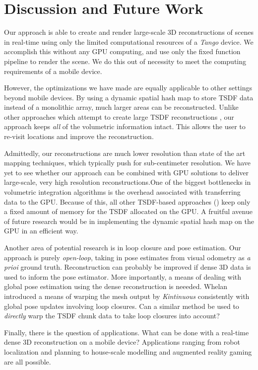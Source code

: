 \documentclass[10pt,twocolumn,letterpaper]{article}
\begin{document}
\section{Discussion and Future Work}
Our approach is able to create and render large-scale 3D reconstructions of
scenes in real-time using only the limited computational resources of a
\textit{Tango} device. We accomplish this without any GPU computing, and use
only the fixed function pipeline to render the scene. We do this out of
necessity to meet the computing requirements of a mobile device.

However, the optimizations we have made are equally applicable to other
settings beyond mobile devices. By using a dynamic spatial hash map to store
TSDF data instead of a monolithic array, much larger areas can be
reconstructed. Unlike other approaches which attempt to create large TSDF
reconstructions \cite{Whelan2013}, our approach keeps \textit{all} of the
volumetric information intact. This allows the user to re-visit locations and
improve the reconstruction.

Admittedly, our reconstructions are much lower resolution than state of the art
mapping techniques, which typically push for sub-centimeter resolution. We have
yet to see whether our approach can be combined with GPU solutions to deliver
large-scale, very high resolution reconstructions.One of the biggest
bottlenecks in volumetric integration algorithms is the overhead associated
with transferring data to the GPU. Because of this, all other TSDF-based
approaches (\cite{Newcombe, Whelan2013, Bylow2013, Nguyen2012}) keep only a
fixed amount of memory for the TSDF allocated on the GPU. A fruitful avenue of
future research would be in implementing the dynamic spatial hash map on the GPU
in an efficient way. 

Another area of potential research is in loop closure and pose estimation. Our
approach is purely \textit{open-loop}, taking in pose estimates from visual
odometry as \textit{a prioi} ground truth. Reconstruction can probably be
improved if dense 3D data is used to inform the pose estimator. More
importantly, a means of dealing with global pose estimation using the dense
reconstruction is neeeded. Whelan \etal\cite{WhelanLoopClose} introduced a
means of warping the mesh output by \textit{Kintinuous} consistently with global
pose updates involving loop closures. Can a similar method be used to
\textit{directly} warp the TSDF chunk data to take loop closures into account?

Finally, there is the question of applications. What can be done with a
real-time dense 3D reconstruction on a mobile device? Applications ranging from
robot localization and planning to house-scale modelling and augmented reality
gaming are all possible.
\end{document}
